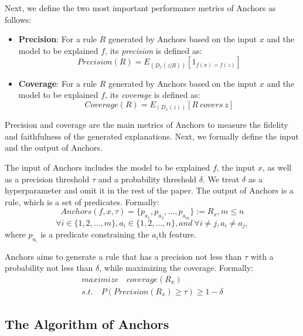 
Next, we define the two most important performance metrics of Anchors as follows:

\begin{itemize}
    \item \textbf{Precision}: For a rule $R$ generated by Anchors based on the input $x$ and the model to be explained $f$, its \emph{precision} is defined as: 
\[ Precision(R) = E_{(D_x(z|R))}[ 1_{f(x)=f(z)}] \]
    \item \textbf{Coverage}: For a rule $R$ generated by Anchors based on the input $x$ and the model to be explained $f$, its \emph{coverage} is defined as: 
\[ Coverage(R) = E_{(D_x(z))}[R\ covers\ z] \]
\end{itemize}

Precision and coverage are the main metrics of Anchors to measure the fidelity and faithfulness of the generated explanations. Next, we formally define the input and the output of Anchors.

The input of Anchors includes the model to be explained $f$, the input $x$, as well as a precision threshold $\tau$ and a probability threshold $\delta$.
We treat $\delta$ as a hyperparameter and omit it in the rest of the paper.
The output of Anchors is a rule, which is a set of predicates. Formally:
$$Anchors(f,x,\tau) = \{p_{a_1},p_{a_2},\dots,p_{a_m}\}:=R_x,m\leq n$$
$$\forall i \in \{1,2,\dots,m\},a_i\in \{1,2,\dots,n\} ,and\ \forall i\neq j,a_i\neq a_j,$$
where $p_{a_i}$ is a predicate constraining the $a_i$th feature.

\label{def:tau}
Anchors aims to generate a rule that has a precision not less than $\tau$ with a probability not less than $\delta$, while maximizing the coverage. Formally:
$$\begin{array}{c}maximize \quad coverage(R_x) \\ s.t.\quad P(Precision(R_x)\geq \tau) \geq 1-\delta
\end{array}$$

\subsection{The Algorithm of Anchors}

